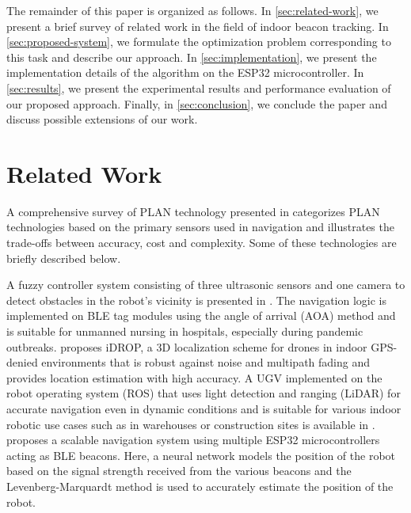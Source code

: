 \documentclass[conference]{IEEEtran}
\begin{document}
The remainder of this paper is organized as follows. In
\autoref{sec:related-work}, we present a brief survey of related work in the
field of indoor beacon tracking. In \autoref{sec:proposed-system}, we formulate
the optimization problem corresponding to this task and describe our approach.
In \autoref{sec:implementation}, we present the implementation details of the
algorithm on the ESP32 microcontroller. In \autoref{sec:results}, we present the
experimental results and performance evaluation of our proposed approach.
Finally, in \autoref{sec:conclusion}, we conclude the paper and discuss possible
extensions of our work.

\section{Related Work}
\label{sec:related-work}

A comprehensive survey of PLAN technology presented in
\cite{el-sheimyIndoorNavigationState2021} categorizes PLAN technologies based on
the primary sensors used in navigation and illustrates the trade-offs between
accuracy, cost and complexity. Some of these technologies are briefly described
below.

A fuzzy controller system  consisting of three ultrasonic sensors and one camera
to detect obstacles in the robot's vicinity is presented in
\cite{narayananFuzzyGuidedAutonomous2022}. The navigation logic is implemented
on BLE tag modules using the angle of arrival (AOA) method and is suitable for
unmanned nursing in hospitals, especially during pandemic outbreaks.
\cite{familiIDROPRobustLocalization2023} proposes iDROP, a 3D localization
scheme for drones in indoor GPS-denied environments that is robust against noise
and multipath fading and provides location estimation with high accuracy. A UGV
implemented on the robot operating system (ROS) that uses light detection and
ranging (LiDAR) for accurate navigation even in dynamic conditions and is
suitable for various indoor robotic use cases such as in warehouses or
construction sites is available in \cite{htROSPoweredAutonomous2024}.
\cite{yukhimetsLocalNavigationSystem2024} proposes a scalable navigation system
using multiple ESP32 microcontrollers acting as BLE beacons. Here, a neural
network models the position of the robot based on the signal strength received
from the various beacons and the Levenberg-Marquardt method is used to
accurately estimate the position of the robot. 
\end{document}
